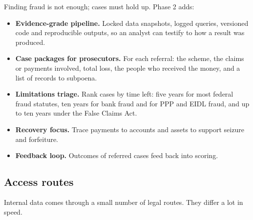 \documentclass[letterpaper,11pt]{article}
\providecommand{\tightlist}{\setlength{\itemsep}{0pt}\setlength{\parskip}{0pt}}
\begin{document}
Finding fraud is not enough; cases must hold up. Phase 2 adds:

\begin{itemize}
\tightlist
\item
  \textbf{Evidence-grade pipeline.} Locked data snapshots, logged
  queries, versioned code and reproducible outputs, so an analyst can
  testify to how a result was produced.
\item
  \textbf{Case packages for prosecutors.} For each referral: the scheme,
  the claims or payments involved, total loss, the people who received
  the money, and a list of records to subpoena.
\item
  \textbf{Limitations triage.} Rank cases by time left: five years for
  most federal fraud statutes, ten years for bank fraud and for PPP and
  EIDL fraud, and up to ten years under the False Claims Act.
\item
  \textbf{Recovery focus.} Trace payments to accounts and assets to
  support seizure and forfeiture.
\item
  \textbf{Feedback loop.} Outcomes of referred cases feed back into
  scoring.
\end{itemize}

\hypertarget{access-routes}{%
\subsection{Access routes}\label{access-routes}}

Internal data comes through a small number of legal routes. They differ
a lot in speed.
\end{document}
